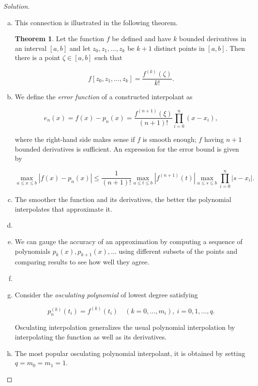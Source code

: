 \documentclass[12pt,a4]{article}
\theoremstyle{definition}
\newtheorem*{theorem*}{Theorem}
\begin{document}
\begin{proof}[Solution]
\begin{enumerate}[(a)]
		\item This connection is illustrated in the following theorem. 
		
		\begin{theorem*}
			Let the function $f$ be defined and have $k$ bounded derivatives in an interval $[a, b]$ and let $z_0, z_1, \ldots, z_k$ be $k + 1$ distinct points in $[a, b]$. Then there is a point $\zeta \in [a, b]$ such that 
			
			\[
			f[z_0, z_1, \ldots, z_k] = \frac{f^{(k)}(\zeta)}{k!} {.}
			\]
		\end{theorem*}
		
		\item We define the \emph{error function} of a constructed interpolant as 
		
		\[
		e_n(x) = f(x) - p_n(x) = \frac{f^{(n + 1)} (\xi)}{(n + 1)!} \prod_{i = 0}^n (x - x_i) {,}
		\]
		
		where the right-hand side makes sense if $f$ is smooth enough; $f$ having $n + 1$ bounded derivatives is sufficient. An expression for the error bound is given by
		
		\[
		\max_{a \leq x \leq b} |f(x) - p_n(x)| \leq \frac{1}{(n + 1)!} \max_{a \leq t \leq b} |f^{(n + 1)}(t)| \max_{a \leq s \leq b} \prod_{i = 0}^{n} |s - x_i| {.}
		\]
		
		\item The smoother the function and its derivatives, the better the polynomial interpolates that approximate it. 
		
		\item 
		
		\item We can gauge the accuracy of an approximation by computing a sequence of polynomials $p_k(x), p_{k + 1}(x), \ldots$ using different subsets of the points and comparing results to see how well they agree. 
		
		\item 
		
		\item Consider the \emph{osculating polynomial} of lowest degree satisfying
		
		\[
		p_n^{(k)} (t_i) = f^{(k)} (t_i) \quad (k = 0, \ldots, m_i), \ i = 0, 1, \ldots, q {.}
		\]
		
		Osculating interpolation generalizes the usual polynomial interpolation by interpolating the function as well as its derivatives. 
		
		\item The most popular osculating polynomial interpolant, it is obtained by setting $q = m_0 = m_1 = 1$. 
	\end{enumerate}
\end{proof}
\end{document}
